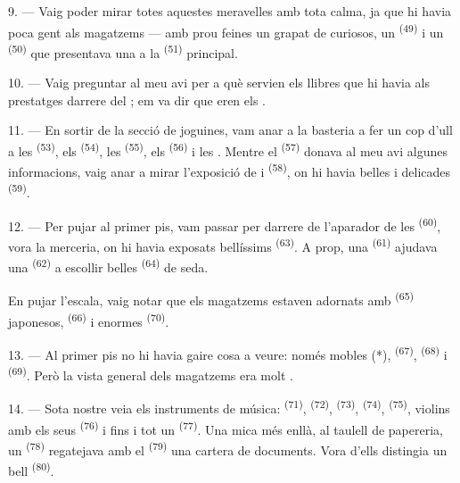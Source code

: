 9. --- Vaig poder mirar totes aquestes meravelles amb tota calma, ja que hi havia poca gent
als magatzems --- amb prou feines un grapat de curiosos, un
 \textsuperscript{(49)} i un 
\textsuperscript{(50)} que presentava una  a la
 \textsuperscript{(51)} principal.

10. --- Vaig preguntar al meu avi per a què servien els llibres que hi havia als prestatges
darrere del ; em va dir que eren els .

\VUsaut{3.6mm}
\VUsaut{2.8mm}

11. --- En sortir de la secció de joguines, vam anar a la basteria a fer un cop d'ull a les
 \textsuperscript{(53)}, els  \textsuperscript{(54)},
les  \textsuperscript{(55)}, els
 \textsuperscript{(56)} i les . Mentre el  \textsuperscript{(57)} donava al meu avi algunes informacions, vaig anar a mirar
l'exposició de  i
 \textsuperscript{(58)}, on hi havia belles
 i delicades  \textsuperscript{(59)}.

12. --- Per pujar al primer pis, vam passar per darrere de l'aparador de les
 \textsuperscript{(60)}, vora la merceria, on hi havia exposats
bellíssims  \textsuperscript{(63)}. A prop, una
 \textsuperscript{(61)} ajudava una 
\textsuperscript{(62)} a escollir belles  \textsuperscript{(64)} de seda.

En pujar l'escala, vaig notar que els magatzems estaven adornats amb
 \textsuperscript{(65)} japonesos, 
\textsuperscript{(66)} i enormes  \textsuperscript{(70)}.

13. --- Al primer pis no hi havia gaire cosa a veure: només mobles (*),
 \textsuperscript{(67)}, 
\textsuperscript{(68)} i  \textsuperscript{(69)}. Però la vista general
dels magatzems era molt .

14. --- Sota nostre veia els instruments de música:  \textsuperscript{(71)},
 \textsuperscript{(72)},
 \textsuperscript{(73)}, 
\textsuperscript{(74)},  \textsuperscript{(75)}, violins amb els seus
 \textsuperscript{(76)} i fins i tot un  \textsuperscript{(77)}.
Una mica més enllà, al taulell de papereria, un
 \textsuperscript{(78)} regatejava amb el 
\textsuperscript{(79)} una cartera de documents. Vora d'ells distingia un bell
 \textsuperscript{(80)}.

